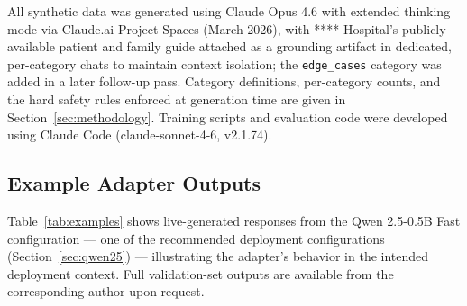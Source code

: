 \documentclass[ASNA,twocolumn]{USG} %
\begin{document}
All synthetic data was generated using Claude Opus 4.6 with extended thinking mode via Claude.ai Project Spaces (March 2026), with **** Hospital's publicly available patient and family guide attached as a grounding artifact in dedicated, per-category chats to maintain context isolation; the \texttt{edge\_cases} category was added in a later follow-up pass. Category definitions, per-category counts, and the hard safety rules enforced at generation time are given in Section~\ref{sec:methodology}. Training scripts and evaluation code were developed using Claude Code (claude-sonnet-4-6, v2.1.74).

\subsection{Example Adapter Outputs}\label{sec:examples}

Table~\ref{tab:examples} shows live-generated responses from the Qwen 2.5-0.5B Fast configuration --- one of the recommended deployment configurations (Section~\ref{sec:qwen25}) --- illustrating the adapter's behavior in the intended deployment context. Full validation-set outputs are available from the corresponding author upon request.

\nocite{*}%
\end{document}
